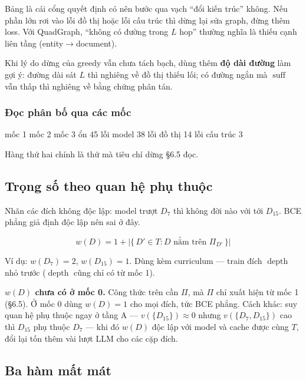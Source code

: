 \documentclass[11pt,a4paper]{article}
\DeclareMathOperator{\suff}{suff}
\DeclareMathOperator{\depthop}{depth}
\begin{document}
Bảng là cái cổng quyết định có nên bước qua vạch ``đổi kiến trúc'' không. Nếu phần lớn rơi
vào lỗi đồ thị hoặc lỗi cấu trúc thì dừng lại sửa graph, đừng thêm loss. Với QuadGraph,
``không có đường trong $L$ hop'' thường nghĩa là thiếu cạnh liên tầng (entity$\to$document).

Khi lý do dừng của greedy vẫn chưa tách bạch, dùng thêm \textbf{độ dài đường} làm gợi ý:
đường dài sát $L$ thì nghiêng về đồ thị thiếu lối; có đường ngắn mà $\suff$ vẫn thấp thì
nghiêng về bằng chứng phân tán.

\subsubsection*{Đọc phân bố qua các mốc}

\begin{dia}
             mốc 1    mốc 2    mốc 3
ổn            45%
lỗi model     38%
lỗi đồ thị    14%
lỗi cấu trúc   3%
\end{dia}

Hàng thứ hai chính là thứ mà tiêu chí dừng \S6.5 đọc.

\subsection{Trọng số theo quan hệ phụ thuộc}

Nhãn các đích không độc lập: model trượt $D_7$ thì không đời nào với tới $D_{15}$. BCE phẳng giả định độc lập nên sai ở đây.

\[ w(D)=1+\big|\{\,D'\in T : D \text{ nằm trên } \Pi_{D'}\,\}\big| \]

Ví dụ: $w(D_7)=2$, $w(D_{15})=1$. Dùng kèm curriculum --- train đích $\depthop$ nhỏ trước ($\depthop$ cũng chỉ có từ mốc 1).

\textbf{$w(D)$ chưa có ở mốc 0.} Công thức trên cần $\Pi$, mà $\Pi$ chỉ xuất hiện từ mốc 1
(\S6.5). Ở mốc 0 dùng $w(D)=1$ cho mọi đích, tức BCE phẳng. Cách khác: suy quan hệ phụ
thuộc ngay ở tầng A --- $v(\{D_{15}\})\approx 0$ nhưng $v(\{D_7,D_{15}\})$ cao thì
$D_{15}$ phụ thuộc $D_7$ --- khi đó $w(D)$ độc lập với model và cache được cùng $T$, đổi
lại tốn thêm vài lượt LLM cho các cặp đích.

\subsection{Ba hàm mất mát}
\end{document}
